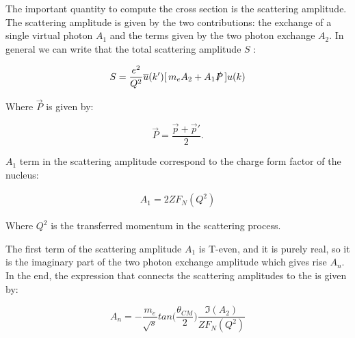 The important quantity to compute the cross section is the scattering amplitude. The scattering amplitude is given by the two contributions: the exchange of a single virtual photon $A_{1}$ and the terms given by the two photon exchange $A_{2}$. In general we can write that the total scattering amplitude $S$ \cite{Gorchtein_2008}:

\begin{equation}
S = \dfrac{e^{2}}{Q^{2}} \overline{u}(k') [ \, m_{e} A_{2} + A_{1} \slashed{P} \,] u(k)
\end{equation}

Where $\vec{P}$ is given by:

\begin{equation}
\vec{P} = \frac{\vec{p} + \vec{p}'}{2} .
\end{equation}

$A_{1}$ term in the scattering amplitude correspond to the charge form factor of the nucleus:

\begin{align*}
A_{1} = 2Z F_{N}(Q^{2})
\end{align*} 

Where $Q^{2}$ is the transferred momentum in the scattering process. 

The first term of the scattering amplitude $A_{1}$ is T-even, and it is purely real, so it is the imaginary part of the two photon exchange amplitude which gives rise $A_{n}$. In the end, the expression that connects the scattering amplitudes to the \transv is given by:

\begin{equation} \label{eq:integral}
A_{n} = -\frac{m_{e}}{\sqrt{s}} tan \bigl (\frac{\theta_{CM}}{2} \bigl) \dfrac{\Im(A_{2})}{ZF_{N}(Q^{2})}
\end{equation}

